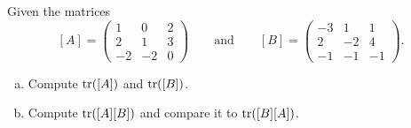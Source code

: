 \documentclass[12pt]{article} %
\begin{document}
\begin{problem}
Given the matrices
\[
[A]=\begin{pmatrix} 1 & 0 & 2 \\ 2  & 1 & 3 \\ -2 & -2 & 0 \end{pmatrix} \qquad \textrm{and} \qquad [B]=\begin{pmatrix} -3 & 1 & 1 \\ 2 & -2 & 4 \\ -1 & -1 & -1 \end{pmatrix}.
\]
\begin{enumerate}[(a)]
    \item Compute $\mathrm{tr}([A])$ and $\mathrm{tr}([B])$.
    \item Compute $\mathrm{tr}([A][B])$ and compare it to $\mathrm{tr}([B][A])$.
\end{enumerate}
\end{problem}
\end{document}
